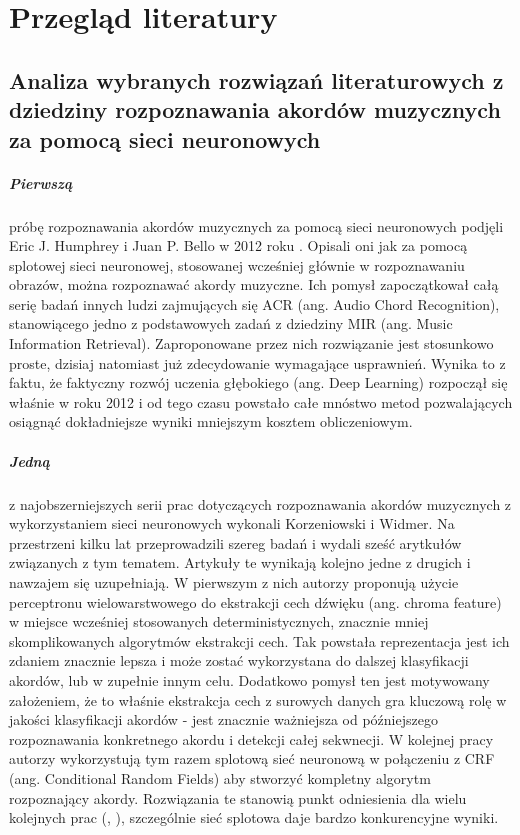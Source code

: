 \chapter{Przegląd literatury}

\section{Analiza wybranych rozwiązań literaturowych z dziedziny rozpoznawania akordów muzycznych za
pomocą sieci neuronowych}

\paragraph{Pierwszą} próbę rozpoznawania akordów muzycznych za pomocą sieci neuronowych podjęli Eric
J. Humphrey i Juan P. Bello w 2012 roku \cite{humphrey_rethinking_2012}. Opisali oni jak za pomocą
splotowej sieci neuronowej, stosowanej wcześniej głównie w rozpoznawaniu obrazów, można rozpoznawać
akordy muzyczne. Ich pomysł zapoczątkował całą serię badań innych ludzi zajmujących się ACR (ang.
Audio Chord Recognition), stanowiącego jedno z podstawowych zadań z dziedziny MIR (ang. Music
Information Retrieval). Zaproponowane przez nich rozwiązanie jest stosunkowo proste, dzisiaj
natomiast już zdecydowanie wymagające usprawnień. Wynika to z faktu, że faktyczny rozwój uczenia
głębokiego (ang. Deep Learning) rozpoczął się właśnie w roku 2012 i od tego czasu powstało całe
mnóstwo metod pozwalających osiągnąć dokładniejsze wyniki mniejszym kosztem obliczeniowym.

\paragraph{Jedną} z najobszerniejszych serii prac dotyczących rozpoznawania akordów muzycznych z
wykorzystaniem sieci neuronowych wykonali Korzeniowski i Widmer. Na przestrzeni kilku lat
przeprowadzili szereg badań i wydali sześć arytkułów związanych z tym tematem. Artykuły te wynikają
kolejno jedne z drugich i nawzajem się uzupełniają. W pierwszym z nich
\cite{korzeniowski_feature_2016} autorzy proponują użycie perceptronu wielowarstwowego do ekstrakcji
cech dźwięku (ang. chroma feature) w miejsce wcześniej stosowanych deterministycznych, znacznie
mniej skomplikowanych algorytmów ekstrakcji cech. Tak powstała reprezentacja jest ich zdaniem
znacznie lepsza i może zostać wykorzystana do dalszej klasyfikacji akordów, lub w zupełnie innym
celu. Dodatkowo pomysł ten jest motywowany założeniem, że to właśnie ekstrakcja cech z surowych
danych gra kluczową rolę w jakości klasyfikacji akordów - jest znacznie ważniejsza od późniejszego
rozpoznawania konkretnego akordu i detekcji całej sekwnecji. W kolejnej pracy
\cite{korzeniowski_feature_2016} autorzy wykorzystują tym razem splotową sieć neuronową w połączeniu
z CRF (ang. Conditional Random Fields) aby stworzyć kompletny algorytm rozpoznający akordy.
Rozwiązania te stanowią punkt odniesienia dla wielu kolejnych prac (\cite{ohanlon_fifthnet_2021},
\cite{park_bi-directional_2019}), szczególnie sieć splotowa daje bardzo konkurencyjne wyniki.

